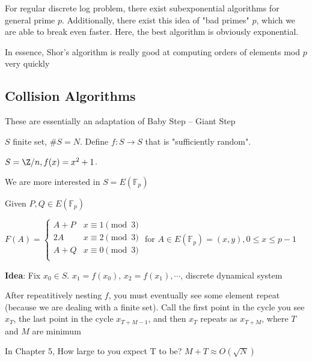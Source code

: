 \documentclass[twoside, 10pt]{article}
\newcommand{\F}{\mathbb{F}}
\begin{document}
\begin{rmk}
    For regular discrete log problem, there exist subexponential algorithms for general prime $p$. Additionally, there exist this idea of "bad primes" $p$, which we are able to break even faster. Here, the best algorithm is obviously exponential.
\end{rmk}

\begin{rmk}
    In essence, Shor's algorithm is really good at computing orders of elements mod $p$ very quickly
\end{rmk}

\subsection{Collision Algorithms} These are essentially an adaptation of Baby Step -- Giant Step

$S$ finite set, $\#S = N$. Define $f : S \to S$ that is "sufficiently random".

\begin{exm*}
    $S  = \Z/n, f(x) = x^2 + 1$.
\end{exm*}

We are more interested in $S = E(\F_p)$

Given $P, Q \in E(\F_p)$

$F(A) = \begin{cases}
    A + P & x \equiv 1\pmod{3}\\
    2A & x \equiv 2\pmod{3}\\
    A + Q & x \equiv 0\pmod{3}\\
\end{cases}$ \hspace{1em} for $A \in E(\F_p) = (x, y), 0 \leq x \leq p-1$

\textbf{Idea}: Fix $x_0 \in S$. $x_1 = f(x_0)$, $x_2 = f(x_1), \cdots$, discrete dynamical system

After repeatitively nesting $f$, you must eventually see some element repeat (because we are dealing with a finite set). Call the first point in the cycle you see $x_T$, the last point in the cycle $x_{T + M - 1}$, and then $x_T$ repeats as $x_{T + M}$, where $T$ and $M$ are minimum

\begin{rmk}
    In Chapter 5, How large to you expect T to be? $M + T \approx O(\sqrt{N})$
\end{rmk}
\end{document}
